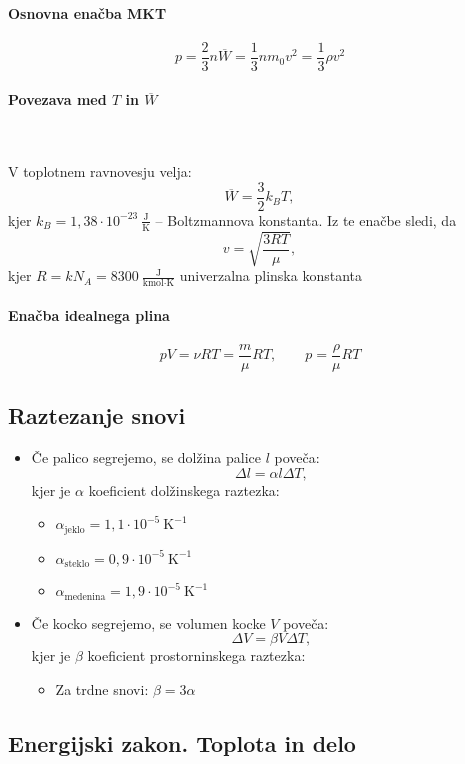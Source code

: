 \paragraph{Osnovna enačba MKT}
\[p = \frac{2}{3}n\overline{W} = \frac{1}{3}nm_0 v^2 = \frac{1}{3} \rho v^2\]
\paragraph{Povezava med \(T\) in \(\overline{W}\)} \

V toplotnem ravnovesju velja:
\[\overline{W} = \frac{3}{2}k_BT,\]
kjer \(k_B = 1,38 \cdot10^{-23} \ \frac{\text{J}}{\text{K}}\) -- Boltzmannova konstanta. Iz te enačbe sledi, da 
\[v = \sqrt{\frac{3RT}{\mu}},\]
kjer \(R = kN_A = 8300 \ \frac{\text{J}}{\text{kmol} \cdot \text{K}}\) univerzalna plinska konstanta

\paragraph{Enačba idealnega plina}
\[pV = \nu RT = \frac{m}{\mu}RT, \qquad p = \frac{\rho}{\mu}RT\]

\subsection{Raztezanje snovi}
\begin{itemize}
    \item Če palico segrejemo, se dolžina palice \(l\) poveča: 
    \[\Delta l = \alpha l \Delta T,\]
    kjer je \(\alpha\) koeficient dolžinskega raztezka:
    \begin{itemize}
        \item \(\alpha_\text{jeklo} = 1,1 \cdot 10^{-5} \ \text{K}^{-1}\)
        \item \(\alpha_\text{steklo} = 0,9 \cdot 10^{-5} \ \text{K}^{-1}\)
        \item \(\alpha_\text{medenina} = 1,9 \cdot 10^{-5} \ \text{K}^{-1}\)
    \end{itemize}
    \item Če kocko segrejemo, se volumen kocke \(V\) poveča:
    \[\Delta V= \beta V \Delta T,\]
    kjer je \(\beta\) koeficient prostorninskega raztezka:
    \begin{itemize}
        \item Za trdne snovi: \(\beta = 3 \alpha\)
    \end{itemize}
\end{itemize}

\subsection{Energijski zakon. Toplota in delo}\ 

